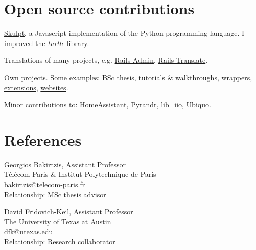 \documentclass[a4paper]{report}
\newcommand{\listitemspace}{0.25em}
\renewenvironment{itemize}
{\begin{list}{}{\setlength{\leftmargin}{0em}
                \setlength{\parskip}{0em}
                \setlength{\itemsep}{\listitemspace}
                \setlength{\parsep}{\listitemspace}}}
{\end{list}}
\begin{document}
\section*{Open source contributions}
\begin{itemize}
    \item \href{https://github.com/royalmo/skulpt}{Skulpt}, a Javascript implementation of the Python programming language. I improved the \textit{turtle} library.
    \item Translations of many projects, e.g. \href{https://github.com/starchow/rails_admin-i18n}{Rails-Admin}, \href{https://github.com/bfcapell/translate}{Rails-Translate}.
    \item Own projects. Some examples: \href{https://gyroscreen.ericroy.net/}{BSc thesis}, \href{https://github.com/royalmo/docker-networks}{tutorials \& walkthroughs}, \href{https://github.com/royalmo/openvpn-manager}{wrappers}, \href{https://github.com/royalmo/itic-copilot}{extensions}, \href{https://umbages.cat}{websites}.
    \item Minor contributions to: \href{https://github.com/home-assistant/developers.home-assistant}{HomeAssistant}, \href{https://github.com/royalmo/pyrandr}{Pyrandr}, \href{https://github.com/analogdevicesinc/libiio/pull/1159}{lib\_iio}, \href{https://github.com/bfcapell/ubiquo/compare/master...royalmo:ubiquo:add_dynamically_ubiquo_assets_2024_11_28}{Ubiquo}.
\end{itemize}


\vspace{-1em}
\section*{References}

\vspace{-1em}

\begin{multicols}{2}
\begin{itemize}
\item Georgios Bakirtzis, Assistant Professor\\ 
 Télécom Paris \& Institut Polytechnique de Paris\\ bakirtzis@telecom-paris.fr\\
 Relationship: MSc thesis advisor

\item David Fridovich-Keil, Assistant Professor\\The University of Texas at Austin\\dfk@utexas.edu\\
Relationship: Research collaborator
\end{itemize}
\end{multicols}
\end{document}
